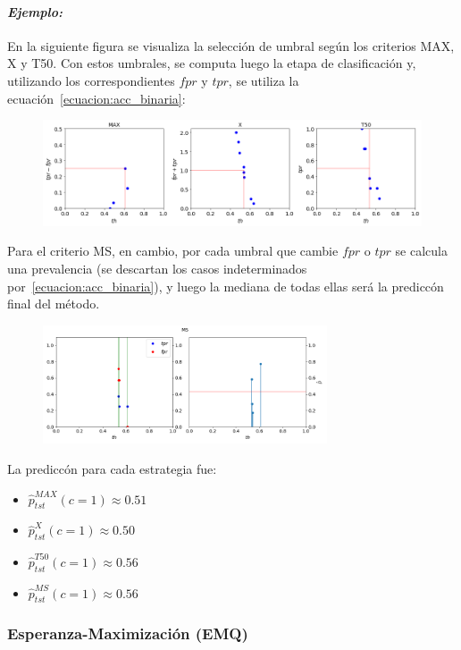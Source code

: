 \paragraph{\it Ejemplo:\/} En la siguiente figura se visualiza la selección de
umbral según los criterios MAX, X y T50. Con estos umbrales, se computa luego la
etapa de clasificación y, utilizando los correspondientes $fpr$ y $tpr$, se
utiliza la ecuación~\ref{ecuacion:acc_binaria}:
\begin{figure}[H]
    \includegraphics[width=\textwidth]{../plots_teoria/seleccion_umbrales_max_x_t50.png}
    \caption{}\label{fig:seleccion_umbrales_max_x_t50}
\end{figure}
Para el criterio MS, en cambio, por cada umbral que cambie $fpr$ o $tpr$ se
calcula una prevalencia (se descartan los casos indeterminados
por~\ref{ecuacion:acc_binaria}), y luego la mediana de todas ellas será la
prediccón final del método.
\begin{figure}[H]
    \centerline{\includegraphics[width=0.75\textwidth]{../plots_teoria/seleccion_umbrales_ms.png}}
    \caption{}\label{fig:seleccion_umbrales_ms}
\end{figure}
La prediccón para cada estrategia fue:
\begin{itemize}
    \item $\hat p^{MAX}_{tst}(c=1) \approx  0.51$
    \item $\hat p^{X}_{tst}(c=1) \approx  0.50$
    \item $\hat p^{T50}_{tst}(c=1) \approx  0.56$
    \item $\hat p^{MS}_{tst}(c=1) \approx  0.56$
\end{itemize}

\subsubsection{Esperanza-Maximización (EMQ)}\label{puntual:emq}

